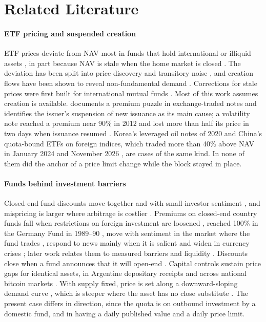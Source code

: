 \documentclass[10pt,journal,a4paper]{IEEEtran}
\theoremstyle{definition}
\begin{document}
\section{Related Literature}\label{sec:literature}
\paragraph{ETF pricing and suspended creation} ETF prices deviate from NAV most in funds that hold international or illiquid assets \citep{petajisto2017inefficiencies,engle2006premiums}, in part because NAV is stale when the home market is closed \citep{levy2013overreaction}. The deviation has been split into price discovery and transitory noise \citep{madhavan2016price}, and creation flows have been shown to reveal non-fundamental demand \citep{brown2021etf}. Corrections for stale prices were first built for international mutual funds \citep{goetzmann2001day,zitzewitz2003who}. Most of this work assumes creation is available. \citet{johnson2016essays} documents a premium puzzle in exchange-traded notes and identifies the issuer's suspension of new issuance as its main cause; a volatility note reached a premium near 90\% in 2012 and lost more than half its price in two days when issuance resumed \citep{finra2012etn}. Korea's leveraged oil notes of 2020 \citep{baek2021investment} and China's quota-bound ETFs on foreign indices, which traded more than 40\% above NAV in January 2024 and November 2026 \citep{reuters2024china,caixin2026nov}, are cases of the same kind. In none of them did the anchor of a price limit change while the block stayed in place.

\paragraph{Funds behind investment barriers} Closed-end fund discounts move together and with small-investor sentiment \citep{lee1991investor}, and mispricing is larger where arbitrage is costlier \citep{pontiff1996costly}. Premiums on closed-end country funds fall when restrictions on foreign investment are loosened \citep{bonserneal1990international}, reached 100\% in the Germany Fund in 1989--90 \citep{hardouvelis1994moves}, move with sentiment in the market where the fund trades \citep{bodurtha1995closed}, respond to news mainly when it is salient \citep{klibanoff1998investor} and widen in currency crises \citep{chandar2000why}; later work relates them to measured barriers and liquidity \citep{chan2008market,kim2010investment,davies2017time}. Discounts close when a fund announces that it will open-end \citep{brauer1984open}. Capital controls sustain price gaps for identical assets, in Argentine depositary receipts \citep{auguste2006cross} and across national bitcoin markets \citep{makarov2020trading}. With supply fixed, price is set along a downward-sloping demand curve \citep{shleifer1986demand}, which is steeper where the asset has no close substitute \citep{wurgler2002does}. The present case differs in direction, since the quota is on outbound investment by a domestic fund, and in having a daily published value and a daily price limit.
\end{document}
